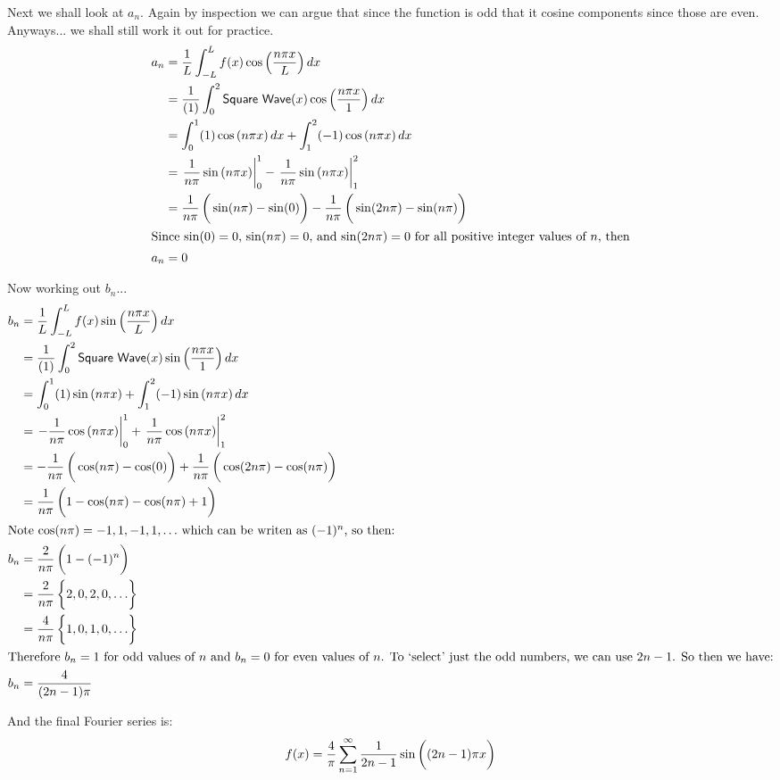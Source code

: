 \documentclass[10pt,letterpaper,twoside,final]{memoir}
\begin{document}
Next we shall look at $a_n$.  Again by inspection we can argue that since the function is odd that it
cosine components since those are even.  Anyways... we shall still work it out for practice.
\begin{align*}
a_n &= \frac{1}{L}  \int_{-L}^L f(x) \cos \left( \frac{n\pi x}{L} \right) dx \\
    &= \frac{1}{(1)} \int_{0}^{2} \mathsf{Square\ Wave}(x)\cos \left( \frac{n\pi x}{1} \right) dx \\ 
    &= \int_0^1 (1) \cos \left( n\pi x \right) dx + \int_1^2 (-1) \cos \left( n\pi x \right) dx \\
    &= \left. \frac{1}{n \pi} \sin \left( n\pi x \right)\right|^1_0 -  \left. \frac{1}{n \pi} \sin \left( n\pi x \right)\right|^2_1 \\
    &= \frac{1}{n \pi} \left( \vphantom{\frac{1}{2}} \sin ( n\pi) - \sin(0) \right) - \frac{1}{n \pi} \left( \vphantom{\frac{1}{2}} \sin (2n\pi) - \sin(n\pi) \right) \\
\intertext{Since $\sin(0) = 0$, $\sin ( n\pi) = 0$, and $\sin (2n\pi) = 0$ for all positive integer values of $n$, then}
a_n &= 0
\end{align*}

Now working out $b_n$...
\begin{align*}
b_n &= \frac{1}{L} \int_{-L}^L f(x) \sin \left( \frac{n\pi x}{L} \right) dx \\
    &= \frac{1}{(1)} \int_0^2 \mathsf{Square\ Wave}(x) \sin \left( \frac{n\pi x}{1} \right) dx \\
    &= \int_0^1 (1) \sin \left( n\pi x \right) + \int_1^2 (-1) \sin \left( n\pi x \right) dx \\
    &= \left. -\frac{1}{n \pi} \cos \left( n\pi x \right)\right|^1_0 + \left. \frac{1}{n \pi} \cos \left( n\pi x \right)\right|^2_1 \\
    &= -\frac{1}{n \pi} \left( \vphantom{\frac{1}{2}} \cos ( n\pi ) - \cos ( 0 ) \right) + \frac{1}{n \pi} \left( \vphantom{\frac{1}{2}} \cos(2n\pi) - \cos(n\pi) \right) \\ 
    &= \frac{1}{n \pi} \left( \vphantom{\frac{1}{2}} 1 - \cos(n\pi) - \cos(n\pi) + 1\right) \\
\intertext{Note $\cos(n\pi) = -1, 1, -1, 1, \ldots$\ which can be writen as $(-1)^n$, so then: }
b_n &= \frac{2}{n \pi} \left( \vphantom{\frac{1}{2}} 1 - (-1)^n \right) \\
    &= \frac{2}{n \pi} \left\{ \vphantom{\frac{1}{2}} 2, 0, 2, 0, \ldots \right\} \\
    &= \frac{4}{n \pi} \left\{ \vphantom{\frac{1}{2}} 1, 0, 1, 0, \ldots \right\} \\
\intertext{Therefore $b_n = 1$ for odd values of $n$ and $b_n = 0$ for even values of $n$.  To `select' just the odd numbers, we can use $2n - 1$.  So then we have:} 
b_n &= \frac{4}{(2n - 1)\pi} 
\end{align*}

And the final Fourier series is:
\[
f(x) = \frac{4}{\pi} \sum^\infty_{n = 1} \frac{1}{2n - 1} \sin \left( (2n - 1) \pi \vphantom{\frac{1}{2}} x \right)
\]

\lipsum[16-17]
\end{document}
